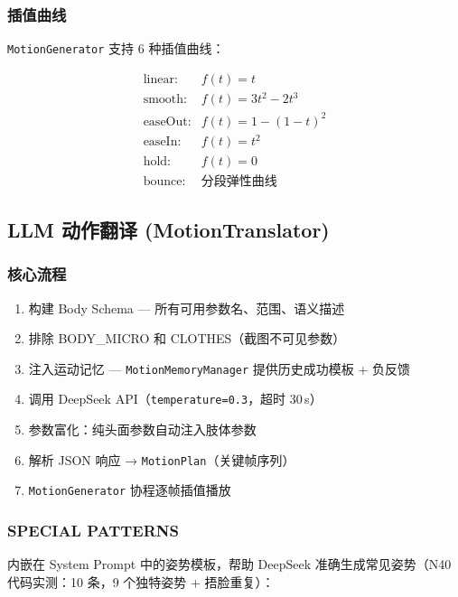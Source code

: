 \documentclass[12pt,a4paper]{ctexart}
\begin{document}
\subsubsection{插值曲线}

\texttt{MotionGenerator} 支持 6 种插值曲线：

\[
\begin{array}{ll}
\text{linear:} & f(t) = t \\
\text{smooth:} & f(t) = 3t^{2} - 2t^{3} \\
\text{easeOut:} & f(t) = 1 - (1-t)^{2} \\
\text{easeIn:} & f(t) = t^{2} \\
\text{hold:} & f(t) = 0 \\
\text{bounce:} & \text{分段弹性曲线}
\end{array}
\]

\subsection{LLM 动作翻译 (MotionTranslator)}

\subsubsection{核心流程}

\begin{enumerate}
    \item 构建 Body Schema --- 所有可用参数名、范围、语义描述
    \item 排除 BODY\_MICRO 和 CLOTHES（截图不可见参数）
    \item 注入运动记忆 --- \texttt{MotionMemoryManager} 提供历史成功模板 + 负反馈
    \item 调用 DeepSeek API（\texttt{temperature=0.3}，超时 30\,s）
    \item 参数富化：纯头面参数自动注入肢体参数
    \item 解析 JSON 响应 → \texttt{MotionPlan}（关键帧序列）
    \item \texttt{MotionGenerator} 协程逐帧插值播放
\end{enumerate}

\subsubsection{SPECIAL PATTERNS}

内嵌在 System Prompt 中的姿势模板，帮助 DeepSeek 准确生成常见姿势（N40 代码实测：10 条，9 个独特姿势 + 捂脸重复）：
\end{document}
